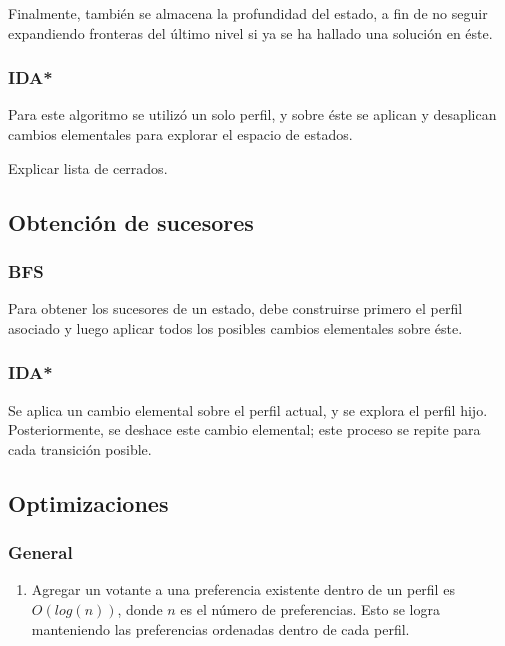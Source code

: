 \documentclass[letterpaper,12pt, titlepage]{article}
\begin{document}
    Finalmente, también se almacena la profundidad del estado, a fin de no seguir
    expandiendo fronteras del último nivel si ya se ha hallado una solución
    en éste.

\subsubsection*{IDA*}
    Para este algoritmo se utilizó un solo perfil, y sobre éste se aplican
    y desaplican cambios elementales para explorar el espacio de estados.

    Explicar lista de cerrados.

\subsection*{Obtención de sucesores}
\subsubsection*{BFS}
    Para obtener los sucesores de un estado, debe construirse primero
    el perfil asociado y luego aplicar todos los posibles cambios elementales
    sobre éste.

\subsubsection*{IDA*}
    Se aplica un cambio elemental sobre
    el perfil actual, y se explora el perfil hijo. Posteriormente,
    se deshace este cambio elemental; este proceso se repite para
   cada transición posible.

\subsection*{Optimizaciones}

\subsubsection*{General}
    \begin{enumerate}
       \item Agregar un votante a una preferencia existente dentro de un perfil
       es $O(log(n))$, donde $n$ es el número de preferencias. Esto se logra
       manteniendo las preferencias ordenadas dentro de cada perfil.
    \end{enumerate}
\end{document}
